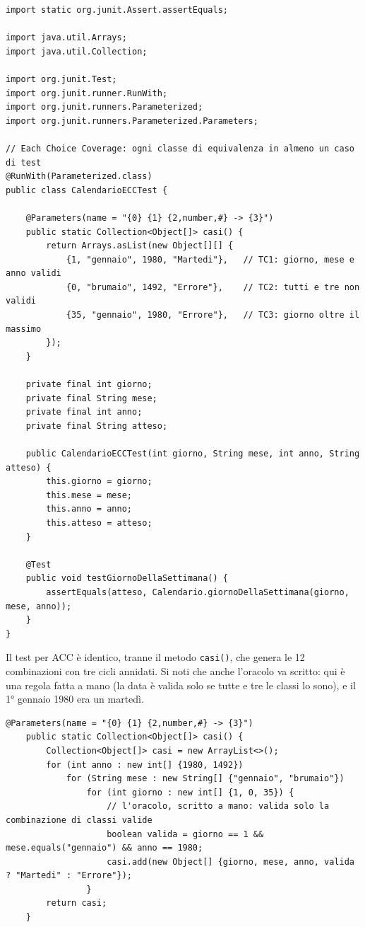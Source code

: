 \begin{lstlisting}[style=java, name=CalendarioECCTest.java]
import static org.junit.Assert.assertEquals;

import java.util.Arrays;
import java.util.Collection;

import org.junit.Test;
import org.junit.runner.RunWith;
import org.junit.runners.Parameterized;
import org.junit.runners.Parameterized.Parameters;

// Each Choice Coverage: ogni classe di equivalenza in almeno un caso di test
@RunWith(Parameterized.class)
public class CalendarioECCTest {

    @Parameters(name = "{0} {1} {2,number,#} -> {3}")
    public static Collection<Object[]> casi() {
        return Arrays.asList(new Object[][] {
            {1, "gennaio", 1980, "Martedi"},   // TC1: giorno, mese e anno validi
            {0, "brumaio", 1492, "Errore"},    // TC2: tutti e tre non validi
            {35, "gennaio", 1980, "Errore"},   // TC3: giorno oltre il massimo
        });
    }

    private final int giorno;
    private final String mese;
    private final int anno;
    private final String atteso;

    public CalendarioECCTest(int giorno, String mese, int anno, String atteso) {
        this.giorno = giorno;
        this.mese = mese;
        this.anno = anno;
        this.atteso = atteso;
    }

    @Test
    public void testGiornoDellaSettimana() {
        assertEquals(atteso, Calendario.giornoDellaSettimana(giorno, mese, anno));
    }
}
\end{lstlisting}

Il test per ACC è identico, tranne il metodo \texttt{casi()}, che genera le 12 combinazioni con tre cicli annidati. Si
noti che anche l'oracolo va scritto: qui è una regola fatta a mano (la data è valida solo se tutte e tre le classi lo
sono), e il 1° gennaio 1980 era un martedì.

\begin{lstlisting}[style=java, name=CalendarioACCTest.java, firstnumber=15]
    @Parameters(name = "{0} {1} {2,number,#} -> {3}")
    public static Collection<Object[]> casi() {
        Collection<Object[]> casi = new ArrayList<>();
        for (int anno : new int[] {1980, 1492})
            for (String mese : new String[] {"gennaio", "brumaio"})
                for (int giorno : new int[] {1, 0, 35}) {
                    // l'oracolo, scritto a mano: valida solo la combinazione di classi valide
                    boolean valida = giorno == 1 && mese.equals("gennaio") && anno == 1980;
                    casi.add(new Object[] {giorno, mese, anno, valida ? "Martedi" : "Errore"});
                }
        return casi;
    }
\end{lstlisting}

